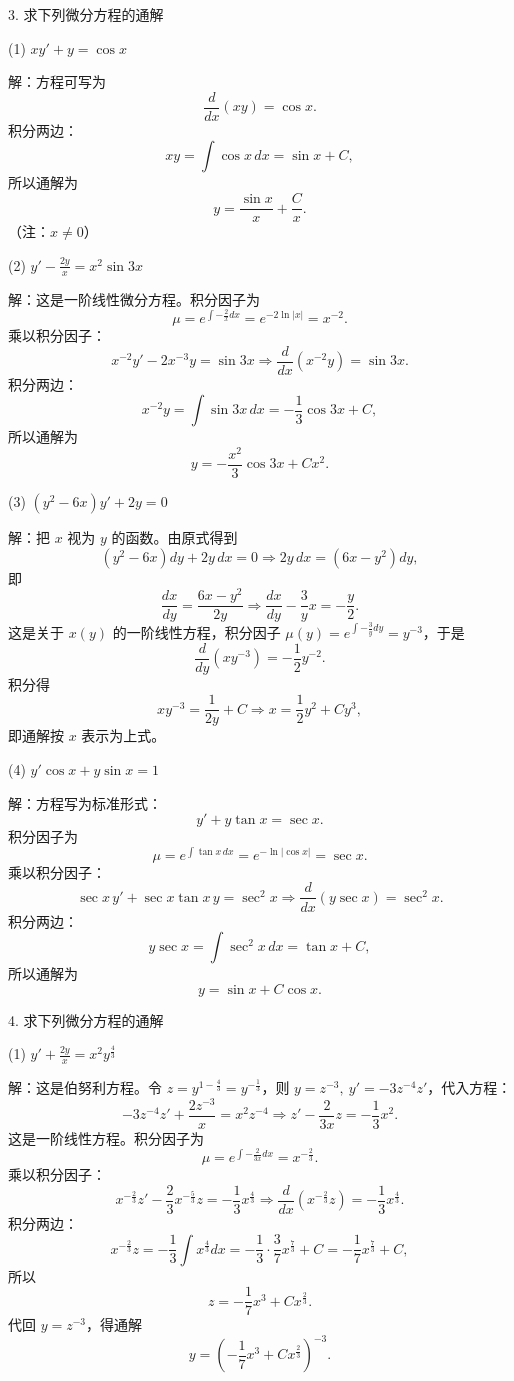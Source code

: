3. 求下列微分方程的通解

(1) \(xy'+y=\cos x\)

解：方程可写为
\[ \frac{d}{dx}(xy)=\cos x. \]
积分两边：
\[ xy=\int\cos x\,dx=\sin x+C, \]
所以通解为
\[ y=\frac{\sin x}{x}+\frac{C}{x}. \]
（注：\(x\ne0\)）

(2) \(y'-\frac{2y}{x}=x^{2}\sin3x\)

解：这是一阶线性微分方程。积分因子为
\[ \mu=e^{\int-\frac{2}{x}dx}=e^{-2\ln|x|}=x^{-2}. \]
乘以积分因子：
\[ x^{-2}y'-2x^{-3}y=\sin3x\Rightarrow\frac{d}{dx}(x^{-2}y)=\sin3x. \]
积分两边：
\[ x^{-2}y=\int\sin3x\,dx=-\frac{1}{3}\cos3x+C, \]
所以通解为
\[ y=-\frac{x^{2}}{3}\cos3x+Cx^{2}. \]

(3) \((y^{2}-6x)y'+2y=0\)

解：把 \(x\) 视为 \(y\) 的函数。由原式得到
\[ (y^{2}-6x)dy+2y\,dx=0\Longrightarrow2y\,dx=(6x-y^{2})dy, \]
即
\[ \frac{dx}{dy}=\frac{6x-y^{2}}{2y}\Longrightarrow\frac{dx}{dy}-\frac{3}{y}x=-\frac{y}{2}. \]
这是关于 \(x(y)\) 的一阶线性方程，积分因子 \(\mu(y)=e^{\int-\frac{3}{y}dy}=y^{-3}\)，于是
\[ \frac{d}{dy}\left(xy^{-3}\right)=-\frac{1}{2}y^{-2}. \]
积分得
\[ xy^{-3}=\frac{1}{2y}+C\Longrightarrow x=\frac{1}{2}y^{2}+Cy^{3}, \]
即通解按 \(x\) 表示为上式。

(4) \(y'\cos x+y\sin x=1\)

解：方程写为标准形式：
\[ y'+y\tan x=\sec x. \]
积分因子为
\[ \mu=e^{\int\tan x\,dx}=e^{-\ln|\cos x|}=\sec x. \]
乘以积分因子：
\[ \sec x\,y'+\sec x\tan x\,y=\sec^{2}x\Rightarrow\frac{d}{dx}(y\sec x)=\sec^{2}x. \]
积分两边：
\[ y\sec x=\int\sec^{2}x\,dx=\tan x+C, \]
所以通解为
\[ y=\sin x+C\cos x. \]

4. 求下列微分方程的通解

(1) \(y'+\frac{2y}{x}=x^{2}y^{\frac{4}{3}}\)

解：这是伯努利方程。令 \(z=y^{1-\frac{4}{3}}=y^{-\frac{1}{3}}\)，则 \(y=z^{-3},\ y'=-3z^{-4}z'\)，代入方程：
\[ -3z^{-4}z'+\frac{2z^{-3}}{x}=x^{2}z^{-4}\Rightarrow z'-\frac{2}{3x}z=-\frac{1}{3}x^{2}. \]
这是一阶线性方程。积分因子为
\[ \mu=e^{\int-\frac{2}{3x}dx}=x^{-\frac{2}{3}}. \]
乘以积分因子：
\[ x^{-\frac{2}{3}}z'-\frac{2}{3}x^{-\frac{5}{3}}z=-\frac{1}{3}x^{\frac{4}{3}}\Rightarrow\frac{d}{dx}\left(x^{-\frac{2}{3}}z\right)=-\frac{1}{3}x^{\frac{4}{3}}. \]
积分两边：
\[ x^{-\frac{2}{3}}z=-\frac{1}{3}\int x^{\frac{4}{3}}dx=-\frac{1}{3}\cdot\frac{3}{7}x^{\frac{7}{3}}+C=-\frac{1}{7}x^{\frac{7}{3}}+C, \]
所以
\[ z=-\frac{1}{7}x^{3}+Cx^{\frac{2}{3}}. \]
代回 \(y=z^{-3}\)，得通解
\[ y=\left(-\frac{1}{7}x^{3}+Cx^{\frac{2}{3}}\right)^{-3}. \]

